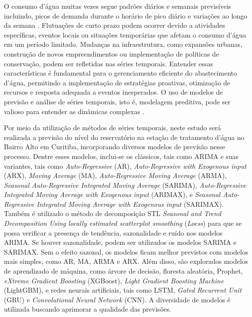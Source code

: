 O consumo d'água muitas vezes segue padrões diários e semanais previsíveis incluindo, picos de demanda durante o horário de pico diário e variações ao longo da semana \cite{SIEGEL2020103481}. Flutuações de curto prazo podem ocorrer devido a atividades específicas, eventos locais ou situações temporárias que afetam o consumo d'água em um período limitado. Mudanças na infraestrutura, como expansões urbanas, construção de novos empreendimentos ou implementação de políticas de conservação, podem ser refletidas nas séries temporais. Entender essas características é fundamental para o gerenciamento eficiente do abastecimento d'água, permitindo a implementação de estratégias proativas, otimização de recursos e resposta adequada a eventos inesperados. O uso de modelos de previsão e análise de séries temporais, isto é, modelagem preditiva, pode ser valioso para entender as dinâmicas complexas \cite{UCCASTILLO2023105788}.

Por meio da utilização de métodos de séries temporais, neste estudo será realizada a previsão do nível do reservatório na estação de tratamento d'água no Bairro Alto em Curitiba, incorporando diversos modelos de previsão nesse processo. Dentre esses modelos, inclui-se os clássicos, tais como ARIMA e suas variantes, tais como \textit{Auto-Regressive} (AR), \textit{Auto-Regressive with Exogenous input} (ARX), \textit{Moving Average} (MA), \textit{Auto-Regressive Moving Average} (ARMA), \textit{Seasonal Auto-Regressive Integrated Moving Average} (SARIMA), \textit{Auto-Regressive Integrated Moving Average with Exogenous input} (ARIMAX), e \textit{Seasonal Auto-Regressive Integrated Moving Average with Exogenous input} (SARIMAX). Também é utilizado o método de decomposição STL \textit{Seasonal and Trend Decomposition Using locally estimated scatterplot smoothing} (\textit{Loess}) para que se possa verificar a presença de tendência, sazonalidade e ruído nos modelos ARIMA. Se houver sazonalidade, podem ser utilizados os modelos SARIMA e SARIMAX. Sem o efeito sazonal, os modelos ficam melhor previstos com modelos mais simples, como AR, MA, ARMA e ARX. Além disso, são explorados modelos de aprendizado de máquina, como árvore de decisão, floresta aleatória, Prophet, \textit{eXtreme Gradient Boosting} (XGBoost), \textit{Light Gradient Boosting Machine} (LightGBM), e redes neurais artificiais, tais como LSTM, \textit{Gated Recurrent Unit} (GRU) e \textit{Convolutional Neural Network} (CNN). A diversidade de modelos é utilizada buscando aprimorar a qualidade das previsões.

